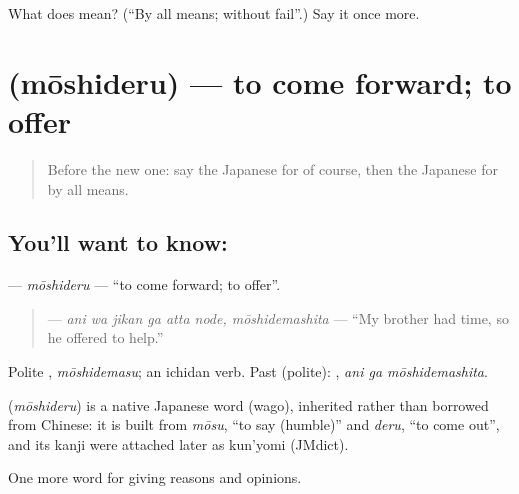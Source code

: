 \begin{tcolorbox}[breakable,colback=teal!4,colframe=teal!35!black,title={Before you move on}]
What does  mean? (\textquotedblleft{}By all means; without fail\textquotedblright{}.) Say it once more.
\end{tcolorbox}
\section[\texorpdfstring{\ja{もうしでる} (mōshideru)}{もうしでる (mōshideru)}]{ (mōshideru) — to come forward; to offer}

\label{lesson:JA-C322-moushideru}



\begin{quote}
Before the new one: say the Japanese for of course, then the Japanese for by all means.
\end{quote}

\subsection*{You'll want to know: }
\textbf{} — \emph{mōshideru} — \textquotedblleft{}to come forward; to offer\textquotedblright{}.

\begin{quote}
\textbf{  } — \emph{ani wa jikan ga atta node, mōshidemashita} — \textquotedblleft{}My brother had time, so he offered to help.\textquotedblright{}
\end{quote}

Polite \textbf{}, \emph{mōshidemasu}; an ichidan verb. Past (polite): \textbf{ }, \emph{ani ga mōshidemashita}.

\begin{cousinweb}
\textbf{} (\emph{mōshideru}) is a native Japanese word (wago), inherited rather than borrowed from Chinese: it is built from \emph{mōsu}, \textquotedblleft{}to say (humble)\textquotedblright{} and \emph{deru}, \textquotedblleft{}to come out\textquotedblright{}, and its kanji were attached later as kun'yomi (JMdict).
\end{cousinweb}

\begin{grammarlens}[title={What you've built}]
One more word for giving reasons and opinions.
\end{grammarlens}

